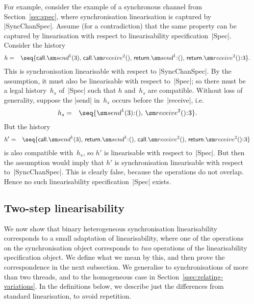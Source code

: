 For example, consider the example of a synchronous channel from
Section~\ref{sec:spec}, where synchronisation linearisation is captured by
|SyncChanSpec|.  Assume (for a contradiction) that the same property can be
captured by linearisation with respect to linearisability
specification~|Spec|.  Consider the history
\begin{eqnarray*}
h & = & \seq{ 
  \call.\send^1(3),\, \call.\receive^2(),\, 
  \return.\send^1\::(),\, \return.\receive^2()\::3 }.
\end{eqnarray*}
%
This is synchronisation linearisable with respect to |SyncChanSpec|.  By the
assumption, it must also be linearisable with respect to~|Spec|; so there must
be a legal history~$h_s$ of~|Spec| such that $h$ and~$h_s$ are compatible.
Without loss of generality, suppose the |send| in~$h_s$ occurs before
the~|receive|, i.e.
\begin{eqnarray*}
h_s & = & \seq{ \send^1(3)\::(),\, \receive^2()\::3 }.
\end{eqnarray*}
%
But the history
%
\begin{eqnarray*}
h' & = & \seq{ 
  \call.\send^1(3),\, \return.\send^1\::(),\, 
  \call.\receive^2(),\, \return.\receive^2()\::3 }
\end{eqnarray*}
%
is also compatible with~$h_s$, so $h'$ is linearisable with respect to~|Spec|.
But then the assumption would imply that $h'$ is synchronisation linearisable
with respect to~|SyncChanSpec|.  This is clearly false, because the operations
do not overlap.  Hence no such linearisability specification~|Spec| exists.



\subsection{Two-step linearisability}


We now show that binary heterogeneous synchronisation linearisability
corresponds to a small adaptation of linearisability, where one of the
operations on the synchronisation object corresponds to \emph{two} operations
of the linearisability specification object.  We define what we mean by this,
and then prove the correspondence in the next subsection.  We generalise to
synchronisations of more than two threads, and to the homogeneous case in
Section~\ref{ssec:relating-variations}.  In the definitions below, we describe
just the differences from standard linearisation, to avoid repetition.

